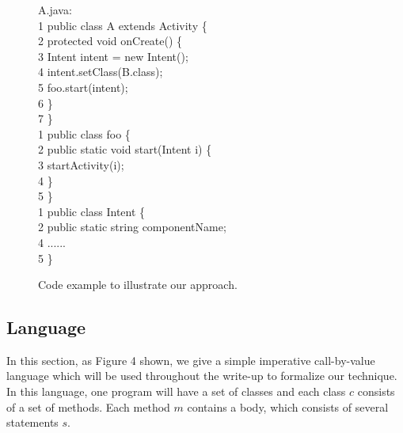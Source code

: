 \documentclass{sig-alternate}
\begin{document}
\begin{figure}

A.java:  \\
      1 public class A extends Activity \{   \\
      2   \hspace{4pt}   protected void onCreate() \{ \\
      3  \hspace{8pt}        Intent intent = new Intent(); \\
      4      \hspace{8pt}     intent.setClass(B.class); \\
     5   \hspace{8pt}       foo.start(intent);  \\
     6    \hspace{4pt}  \}   \\
     7 \}   \\
     
      1 public class foo \{   \\
      2   \hspace{4pt}   public static void start(Intent i) \{ \\
     3  \hspace{8pt}       startActivity(i);  \\
     4    \hspace{4pt}  \}   \\
     5 \}   \\
     
           1 public class Intent \{   \\
      2   \hspace{4pt}   public static string componentName; \\
     4    \hspace{4pt} ......   \\
     5 \}   \\

\caption{Code example to illustrate our approach.}
\label{fig-ffsm}
\end{figure}

\subsection{Language}
In this section, as Figure 4 shown, we give a simple imperative call-by-value language which will be used throughout the write-up to formalize our technique. 
In this language, one program will have a set of classes and each class $c$ consists of a set of methods. Each method $m$ contains a body, which consists of several statements $s$.  
\end{document}
